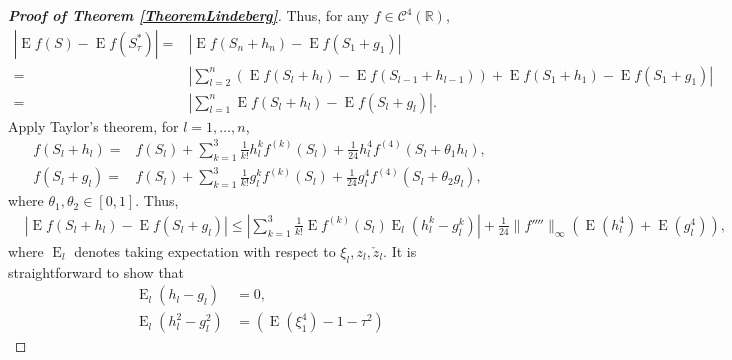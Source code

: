 \documentclass[11pt]{article}
\DeclareMathOperator{\myE}{E}
\theoremstyle{plain}
\theoremstyle{definition}
\theoremstyle{remark}
\begin{document}
\begin{appendices}
\begin{proof}[\textbf{Proof of Theorem \ref{TheoremLindeberg}}]
    Thus, for any $f \in \mathscr C^4 (\mathbb R)$,
    \begin{equation*}
        \begin{split}
        \left|\myE f\left(S\right)
        -
        \myE f\left(S_\tau^*\right)\right| 
        =&
        \left| \myE f(S_n+h_n)-\myE f(S_1+g_1)\right|
        \\
        =&
        \left|\sum_{l=2}^{n} \left(\myE f(S_{l}+h_{l})-\myE f(S_{l-1}+h_{l-1})\right)+\myE f(S_{1}+h_{1})-\myE f(S_{1}+g_{1})\right|
        \\
        = &
       \left| \sum_{l=1}^{n} \myE f(S_{l}+h_{l})-\myE f(S_{l}+g_{l})\right|
       .
        \end{split}
    \end{equation*}
    Apply Taylor's theorem, for $l=1,\ldots,n$,
    \begin{equation*}
        \begin{split}
            f(S_{l}+h_{l})=&
            f(S_{l})
            +
            \sum_{k=1}^3
            \frac{1}{k!} h_l^k f^{(k)} (S_{l})
            +
            \frac{1}{24}h_{l}^4 f^{(4)} (S_{l}+\theta_1 h_{l}),
            \\
            f(S_{l}+g_{l})=&
            f(S_{l})
            +
            \sum_{k=1}^3
            \frac{1}{k!} g_l^k f^{(k)} (S_{l})
            +
            \frac{1}{24}g_{l}^4 f^{(4)} (S_{l}+\theta_{2} g_{l}),
        \end{split}
    \end{equation*}
    where $\theta_1,\theta_2\in[0,1]$.
    Thus,
    \begin{equation*}
        \begin{split}
             &\left| \myE f(S_{l}+h_{l})-\myE f(S_{l}+g_{l})\right|
\leq
\left|
            \sum_{k=1}^3
            \frac{1}{k!} \myE f^{(k)} (S_{l})
            \myE_l (h_l^k - g_l^k)
            \right|
            +
            \frac{1}{24} \|f'''' \|_{\infty} \left(\myE (h_{l}^4)+\myE (g_{l}^4)\right),
        \end{split}
    \end{equation*}
where $\myE_l$ denotes taking expectation with respect to $\xi_l, z_l ,\check z_l$.
It is straightforward to show that
\begin{equation*}
    \begin{split}
        \myE_l (h_l-g_l)&=0, 
        \\
        \myE_l (h_l^2-g_l^2)&= 
        \left(
            \myE (\xi_1^4) - 1
            -
            \tau^2
        \right)

\end{split}
\end{equation*}
\end{proof}
\end{appendices}
\end{document}
